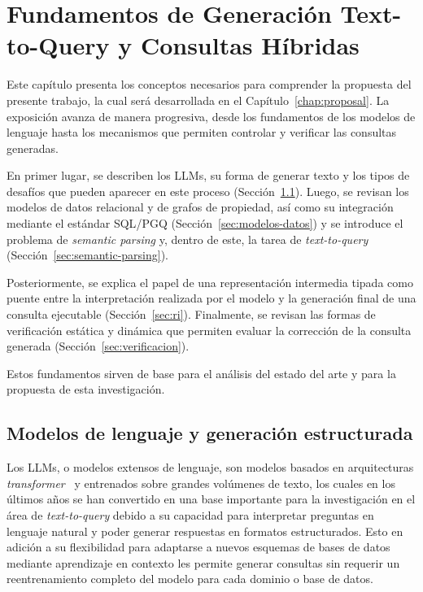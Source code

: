 \chapter{Fundamentos de Generación Text-to-Query y Consultas Híbridas}\label{chap:background}


Este capítulo presenta los conceptos necesarios para comprender la propuesta del presente trabajo, la cual será desarrollada en el Capítulo~\ref{chap:proposal}. La exposición avanza de manera progresiva, desde los fundamentos de los modelos de lenguaje hasta los mecanismos que permiten controlar y verificar las consultas generadas.

En primer lugar, se describen los \acp{LLM}, su forma de generar texto y los tipos de desafíos que pueden aparecer en este proceso (Sección~\ref{sec:modelos-lenguaje}). Luego, se revisan los modelos de datos relacional y de grafos de propiedad, así como su integración mediante el estándar \ac{SQL}/\ac{PGQ} (Sección~\ref{sec:modelos-datos}) y se introduce el problema de \emph{semantic parsing} y, dentro de este, la tarea de \emph{text-to-query} (Sección~\ref{sec:semantic-parsing}).

Posteriormente, se explica el papel de una representación intermedia tipada como puente entre la interpretación realizada por el modelo y la generación final de una consulta ejecutable (Sección~\ref{sec:ri}). Finalmente, se revisan las formas de verificación estática y dinámica que permiten evaluar la corrección de la consulta generada (Sección~\ref{sec:verificacion}).

Estos fundamentos sirven de base para el análisis del estado del arte y para la propuesta de esta investigación.

\section{Modelos de lenguaje y generación estructurada}
\label{sec:modelos-lenguaje}

Los \acp{LLM}, o modelos extensos de lenguaje, son modelos basados en arquitecturas \emph{transformer}~\cite{Vaswani2017Attention} y entrenados sobre grandes volúmenes de texto, los cuales en los últimos años se han convertido en una base importante para la investigación en el área de \emph{text-to-query} debido a su capacidad para interpretar preguntas en lenguaje natural y poder generar respuestas en formatos estructurados. Esto en adición a su flexibilidad para adaptarse a nuevos esquemas de bases de datos mediante aprendizaje en contexto \cite{Brown2020GPT3} les permite generar consultas sin requerir un reentrenamiento completo del modelo para cada dominio o base de datos. 

